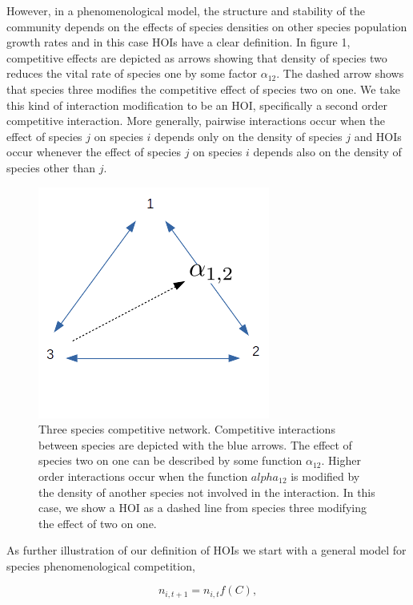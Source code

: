 \documentclass[12pt,]{article}
\begin{document}
However, in a phenomenological model, the structure and stability of the
community depends on the effects of species densities on other species
population growth rates and in this case HOIs have a clear definition.
In figure 1, competitive effects are depicted as arrows showing that
density of species two reduces the vital rate of species one by some
factor \(\alpha_{12}\). The dashed arrow shows that species three
modifies the competitive effect of species two on one. We take this kind
of interaction modification to be an HOI, specifically a second order
competitive interaction. More generally, pairwise interactions occur
when the effect of species \(j\) on species \(i\) depends only on the
density of species \(j\) and HOIs occur whenever the effect of species
\(j\) on species \(i\) depends also on the density of species other than
\(j\).

\begin{figure}
\centering
\includegraphics{../figures/HOI_1.png}
\caption{Three species competitive network. Competitive interactions
between species are depicted with the blue arrows. The effect of species
two on one can be described by some function \(\alpha_{12}\). Higher
order interactions occur when the function \(alpha_{12}\) is modified by
the density of another species not involved in the interaction. In this
case, we show a HOI as a dashed line from species three modifying the
effect of two on one.}
\end{figure}

As further illustration of our definition of HOIs we start with a
general model for species phenomenological competition,

\vspace{-1em}

\begin{equation} \label{eq1}
n_{i,t+1} = n_{i,t}f(C), 
\end{equation}
\end{document}
